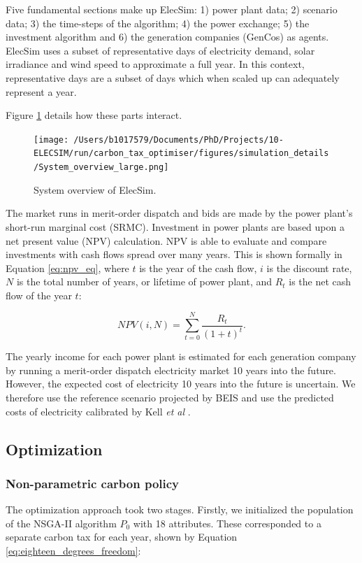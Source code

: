 \documentclass[sigconf]{acmart}
\begin{document}
Five fundamental sections make up ElecSim: 1) power plant data; 2) scenario data; 3) the time-steps of the algorithm; 4) the power exchange; 5) the investment algorithm and 6) the generation companies (GenCos) as agents. ElecSim uses a subset of representative days of electricity demand, solar irradiance and wind speed to approximate a full year. In this context, representative days are a subset of days which when scaled up can adequately represent a year. 

Figure \ref{fig:model_details} details how these parts interact.

\begin{figure}
\centering
\texttt{[image: /Users/b1017579/Documents/PhD/Projects/10-ELECSIM/run/carbon\_tax\_optimiser/figures/simulation\_details/System\_overview\_large.png]}
\caption{System overview of ElecSim.}
\label{fig:model_details}
\end{figure}

The market runs in merit-order dispatch and bids are made by the power plant's short-run marginal cost (SRMC). Investment in power plants are based upon a net present value (NPV) calculation. NPV is able to evaluate and compare investments with cash flows spread over many years. This is shown formally in Equation \ref{eq:npv_eq}, where $t$ is the year of the cash flow, $i$ is the discount rate, $N$ is the total number of years, or lifetime of power plant, and $R_t$ is the net cash flow of the year $t$:

\begin{equation} \label{eq:npv_eq}
NPV(i, N) = \sum_{t=0}^{N}\frac{R_t}{(1+t)^t}.
\end{equation}

The yearly income for each power plant is estimated for each generation company by running a merit-order dispatch electricity market 10 years into the future. However, the expected cost of electricity 10 years into the future is uncertain. We therefore use the reference scenario projected by BEIS and use the predicted costs of electricity calibrated by Kell \textit{et al} \cite{DBEIS2019, Kell2020}.



\subsection{Optimization}
\label{ssec:optimization}
\subsubsection{Non-parametric carbon policy}
\label{sssec:non_parametric_strategy}
The optimization approach took two stages. Firstly, we initialized the population of the NSGA-II algorithm $P_0$ with 18 attributes. These corresponded to a separate carbon tax for each year, shown by Equation \ref{eq:eighteen_degrees_freedom}:
\end{document}
